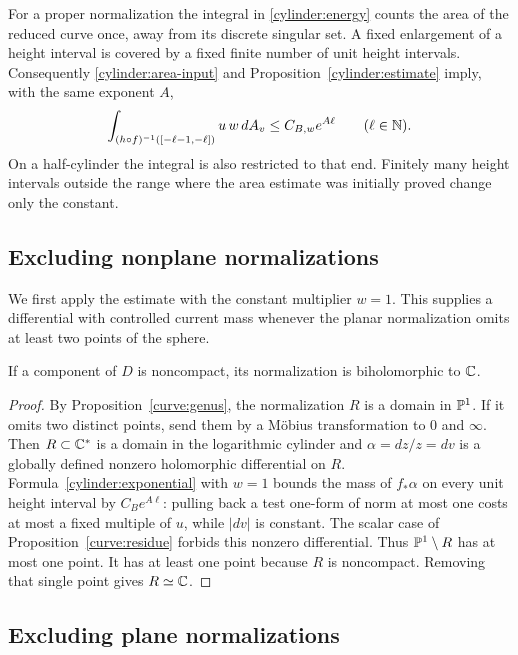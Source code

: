 For a proper normalization the integral in \eqref{cylinder:energy}
counts the area of the reduced curve once, away from its discrete
singular set.  A fixed enlargement of a height interval is covered
by a fixed finite number of unit height intervals.  Consequently
\eqref{cylinder:area-input} and Proposition~\ref{cylinder:estimate}
imply, with the same exponent $A$,
\begin{equation}\label{cylinder:exponential}
 \int_{(h\circ f)^{-1}([-\ell-1,-\ell])}u\,w\,dA_v
          \leq C_{B,w}e^{A\ell}\qquad(\ell\in\mathbb N).
\end{equation}
On a half-cylinder the integral is also restricted to that end.
Finitely many height intervals outside the range where the area
estimate was initially proved change only the constant.

\subsection{Excluding nonplane normalizations}

We first apply the estimate with the constant multiplier $w=1$.
This supplies a differential with controlled current mass whenever
the planar normalization omits at least two points of the sphere.

\begin{corollary}\label{cylinder:plane}
If a component of $D$ is noncompact, its normalization is biholomorphic
to $\mathbb C$.
\end{corollary}

\begin{proof}
By Proposition~\ref{curve:genus}, the normalization $R$ is a domain in
$\mathbb P^1$.  If it omits two distinct points, send them by a M\"obius
transformation to $0$ and $\infty$.  Then $R\subset\mathbb C^*$ is a domain
in the logarithmic cylinder and
$\alpha=dz/z=dv$ is a globally defined nonzero holomorphic
differential on $R$.  Formula~\eqref{cylinder:exponential} with
$w=1$ bounds the mass of $f_*\alpha$ on every unit height interval by
$C_Be^{A\ell}$: pulling back a test one-form of norm at most one
costs at most a fixed multiple of $u$, while $|dv|$ is constant.
The scalar case of Proposition~\ref{curve:residue} forbids this
nonzero differential.  Thus $\mathbb P^1\setminus R$ has at most one point.
It has at least one point because $R$ is noncompact.  Removing that
single point gives $R\simeq\mathbb C$.
\end{proof}

\subsection{Excluding plane normalizations}

